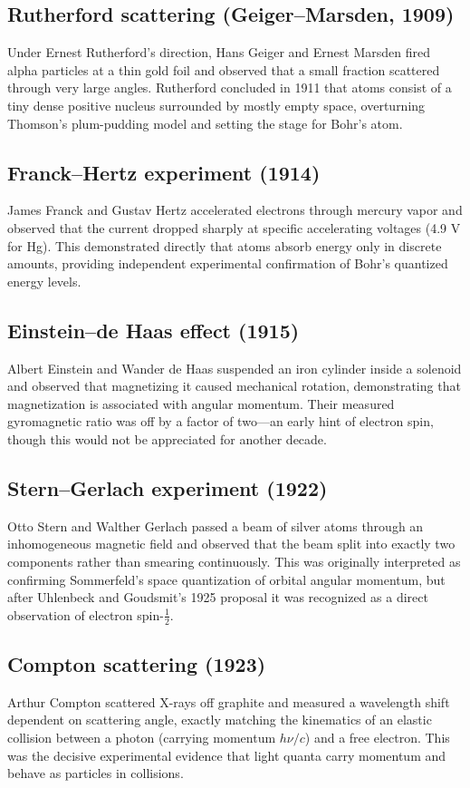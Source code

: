 \documentclass[11pt]{article}
\begin{document}
\subsection{Rutherford scattering (Geiger--Marsden, 1909)}
Under Ernest Rutherford's direction, Hans Geiger and Ernest Marsden fired alpha particles at a thin gold foil and observed that a small fraction scattered through very large angles. Rutherford concluded in 1911 that atoms consist of a tiny dense positive nucleus surrounded by mostly empty space, overturning Thomson's plum-pudding model and setting the stage for Bohr's atom.

\subsection{Franck--Hertz experiment (1914)}
James Franck and Gustav Hertz accelerated electrons through mercury vapor and observed that the current dropped sharply at specific accelerating voltages (4.9 V for Hg). This demonstrated directly that atoms absorb energy only in discrete amounts, providing independent experimental confirmation of Bohr's quantized energy levels.

\subsection{Einstein--de Haas effect (1915)}
Albert Einstein and Wander de Haas suspended an iron cylinder inside a solenoid and observed that magnetizing it caused mechanical rotation, demonstrating that magnetization is associated with angular momentum. Their measured gyromagnetic ratio was off by a factor of two---an early hint of electron spin, though this would not be appreciated for another decade.

\subsection{Stern--Gerlach experiment (1922)}
Otto Stern and Walther Gerlach passed a beam of silver atoms through an inhomogeneous magnetic field and observed that the beam split into exactly two components rather than smearing continuously. This was originally interpreted as confirming Sommerfeld's space quantization of orbital angular momentum, but after Uhlenbeck and Goudsmit's 1925 proposal it was recognized as a direct observation of electron spin-$\tfrac{1}{2}$.

\subsection{Compton scattering (1923)}
Arthur Compton scattered X-rays off graphite and measured a wavelength shift dependent on scattering angle, exactly matching the kinematics of an elastic collision between a photon (carrying momentum $h\nu/c$) and a free electron. This was the decisive experimental evidence that light quanta carry momentum and behave as particles in collisions.
\end{document}
